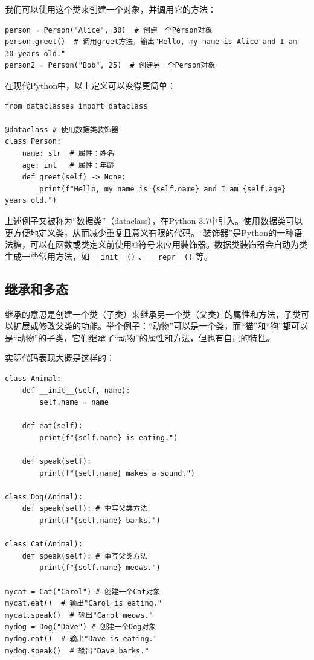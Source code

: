 我们可以使用这个类来创建一个对象，并调用它的方法：
\begin{verbatim}
person = Person("Alice", 30)  # 创建一个Person对象
person.greet()  # 调用greet方法，输出"Hello, my name is Alice and I am 30 years old."
person2 = Person("Bob", 25)  # 创建另一个Person对象
\end{verbatim}

在现代Python中，以上定义可以变得更简单：
\begin{verbatim}
from dataclasses import dataclass

@dataclass # 使用数据类装饰器
class Person:
    name: str  # 属性：姓名
    age: int   # 属性：年龄
    def greet(self) -> None:
        print(f"Hello, my name is {self.name} and I am {self.age} years old.")
\end{verbatim}
上述例子又被称为“数据类”（dataclass），在Python
3.7中引入。使用数据类可以更方便地定义类，从而减少重复且意义有限的代码。“装饰器”是Python的一种语法糖，可以在函数或类定义前使用@符号来应用装饰器。数据类装饰器会自动为类生成一些常用方法，如 \texttt{\_\_init\_\_()} 、 \texttt{\_\_repr\_\_()} 等。

\subsection{继承和多态}

继承的意思是创建一个类（子类）来继承另一个类（父类）的属性和方法，子类可以扩展或修改父类的功能。举个例子：“动物”可以是一个类，而“猫”和“狗”都可以是“动物”的子类，它们继承了“动物”的属性和方法，但也有自己的特性。

实际代码表现大概是这样的：
\begin{verbatim}
class Animal:
    def __init__(self, name):
        self.name = name

    def eat(self):
        print(f"{self.name} is eating.")

    def speak(self):
        print(f"{self.name} makes a sound.")

class Dog(Animal):
    def speak(self): # 重写父类方法
        print(f"{self.name} barks.")

class Cat(Animal):
    def speak(self): # 重写父类方法
        print(f"{self.name} meows.")

mycat = Cat("Carol") # 创建一个Cat对象
mycat.eat()  # 输出"Carol is eating."
mycat.speak()  # 输出"Carol meows."
mydog = Dog("Dave") # 创建一个Dog对象
mydog.eat()  # 输出"Dave is eating."
mydog.speak()  # 输出"Dave barks."
\end{verbatim}

